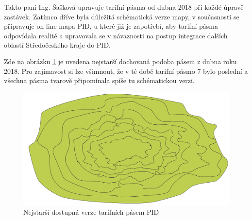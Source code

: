 Takto paní Ing. Šašková upravuje tarifní pásma od dubna 2018 při každé úpravě zastávek. 
Zatímco dříve byla důležitá schématická verze mapy, v současnosti se připravuje on-line mapa PID, u které již je zapotřebí, 
aby tarifní pásma odpovídala realitě a upravovala se v návaznosti na postup
integrace dalších oblastí Středočeského kraje do PID.

Zde na obrázku \ref{fig:pasma-schema} je uvedena nejstarší dochovaná podoba pásem z dubna roku 2018.
Pro zajímavost si lze všimnout, že v té době tarifní pásmo 7 bylo poslední a všechna pásma tvarově připomínala
spíše tu schématickou verzi.

\begin{figure}[H] \centering
    \includegraphics[width=400pt]{./pictures/pasma-nejstarsi.png}
    \caption[Nejstarší dostupná verze tarifních pásem PID]{Nejstarší dostupná verze tarifních pásem PID}
	\label{fig:pasma-schema}                                
\end{figure}


